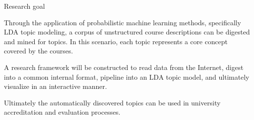 \begin{frame}{Research goal}

  \vfill

  Through the application of probabilistic machine learning methods,
  specifically LDA topic modeling, a corpus of unstructured course
  descriptions can be digested and mined for topics. In this scenario, each
  topic represents a core concept covered by the courses.

  \vfill

  A research framework will be constructed to read data from the
  Internet, digest into a common internal format, pipeline into an LDA
  topic model, and ultimately visualize in an interactive manner.

  \vfill

  Ultimately the automatically discovered topics can be used in
  university accreditation and evaluation processes.

  \vfill

\end{frame}
